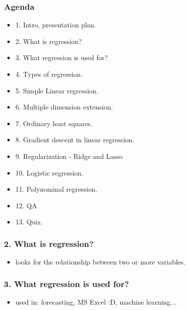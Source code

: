 \documentclass[handout,compress]{beamer} %
\begin{document}
\renewcommand{\logosinfootline}{\raisebox{0.12cm}{\begin{beamercolorbox}{rafi}{Seminar \quad Overview regression methods \hfill \insertframenumber/\inserttotalframenumber}\end{beamercolorbox}}}
\begin{frame}[allowframebreaks]
	\frametitle{Agenda}
    \begin{itemize}
    \item 1. Intro, presentation plan.
    \item 2. What is regression?
    \item 3. What regression is used for?
    \item 4. Types of regression.
    \item 5. Simple Linear regression.
    \item 6. Multiple dimension extension.
    \item 7. Ordinary least squares.
    \item 8. Gradient descent in linear regression.
    \item 9. Regularization - Ridge and Lasso
    \item 10. Logistic regression.
    \item 11. Polynominal regression.
    \item 12. QA
    \item 13. Quiz.
	\end{itemize}
\end{frame}
\begin{frame}
	\frametitle{2. What is regression?}
	\begin{itemize}
	\item looks for the relationship between two or more variables.
\end{itemize}		
\end{frame}
\begin{frame}
	\frametitle{3. What regression is used for?}	
	\begin{itemize}
	\item used in: forecasting, MS Excel :D, machine learning...
	\end{itemize}
\end{frame}
\end{document}
